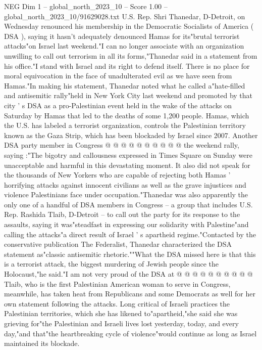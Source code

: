 \begin{textsample}{NEG Dim 1 – global\_north\_2023\_10 – Score 1.00 – global\_north\_2023\_10/91629028.txt}  \label{ex:f1_neg_308}
U.S.
Rep.
Shri Thanedar, D-Detroit, on Wednesday renounced his membership in the Democratic Socialists of America ( DSA ), saying it hasn't adequately denounced Hamas for its"brutal terrorist attacks"on Israel last weekend."I can no longer associate with an organization unwilling to call out terrorism in all its forms,"Thanedar said in a statement from his office."I stand with Israel and its right to defend itself.
There is no place for moral equivocation in the face of unadulterated evil as we have seen from Hamas."In making his statement, Thanedar noted what he called a"hate-filled and antisemitic rally"held in New York City last weekend and promoted by that city ' s DSA as a pro-Palestinian event held in the wake of the attacks on Saturday by Hamas that led to the deaths of some 1,200 people.
Hamas, which the U.S. has labeled a terrorist organization, controls the Palestinian territory known as the Gaza Strip, which has been blockaded by Israel since 2007.
Another DSA party member in Congress @ @ @ @ @ @ @ @ @ @ the weekend rally, saying :"The bigotry and callousness expressed in Times Square on Sunday were unacceptable and harmful in this devastating moment.
It also did not speak for the thousands of New Yorkers who are capable of rejecting both Hamas ' horrifying attacks against innocent civilians as well as the grave injustices and violence Palestinians face under occupation."Thanedar was also apparently the only one of a handful of DSA members in Congress -- a group that includes U.S.
Rep.
Rashida Tlaib, D-Detroit -- to call out the party for its response to the assaults, saying it was"steadfast in expressing our solidarity with Palestine"and calling the attacks"a direct result of Israel ' s apartheid regime."Contacted by the conservative publication The Federalist, Thanedar characterized the DSA statement as"classic antisemitic rhetoric.""What the DSA missed here is that this is a terrorist attack, the biggest murdering of Jewish people since the Holocaust,"he said."I am not very proud of the DSA at @ @ @ @ @ @ @ @ @ @ Tlaib, who is the first Palestinian American woman to serve in Congress, meanwhile, has taken heat from Republicans and some Democrats as well for her own statement following the attacks.
Long critical of Israeli practices the Palestinian territories, which she has likened to"apartheid,"she said she was grieving for"the Palestinian and Israeli lives lost yesterday, today, and every day,"and that"the heartbreaking cycle of violence"would continue as long as Israel maintained its blockade.

\end{textsample}
